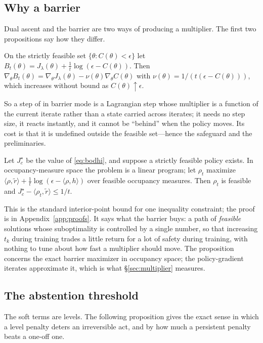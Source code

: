\subsection{Why a barrier}
Dual ascent and the barrier are two ways of producing a multiplier.
The first two propositions say how they differ.

\begin{proposition}
\label{prop:barrier}
On the strictly feasible set $\{\theta: C(\theta)<\epsilon\}$ let $B_t(\theta)=J_\lambda(\theta)+\tfrac1t\log(\epsilon-C(\theta))$.
Then $\nabla_\theta B_t(\theta)=\nabla_\theta J_\lambda(\theta)-\nu(\theta)\nabla_\theta C(\theta)$ with $\nu(\theta)=1/(t(\epsilon-C(\theta)))$, which increases without bound as $C(\theta)\uparrow\epsilon$.
\end{proposition}

So a step of \BRAG{} in barrier mode is a Lagrangian step whose multiplier is a function of the current iterate rather than a state carried across iterates; it needs no step size, it reacts instantly, and it cannot be ``behind'' when the policy moves.
Its cost is that it is undefined outside the feasible set---hence the safeguard and the preliminaries.

\begin{proposition}
\label{prop:gap}
Let $J^\star_c$ be the value of \eqref{eq:bodhi}, and suppose a strictly feasible policy exists.
In occupancy-measure space the problem is a linear program; let $\rho_t$ maximize $\langle\rho,\tilde r\rangle+\tfrac1t\log(\epsilon-\langle\rho,h\rangle)$ over feasible occupancy measures.
Then $\rho_t$ is feasible and $J^\star_c-\langle\rho_t,\tilde r\rangle\le 1/t$.
\end{proposition}

This is the standard interior-point bound \cite[\S11.2]{boyd2004convex} for one inequality constraint; the proof is in Appendix~\ref{app:proofs}.
It says what the barrier buys: a path of \emph{feasible} solutions whose suboptimality is controlled by a single number, so that increasing $t_k$ during training trades a little return for a lot of safety during training, with nothing to tune about how fast a multiplier should move.
The proposition concerns the exact barrier maximizer in occupancy space; the policy-gradient iterates approximate it, which is what \S\ref{sec:multiplier} measures.

\subsection{The abstention threshold}
\label{sec:threshold}
The soft terms are levels.
The following proposition gives the exact sense in which a level penalty deters an irreversible act, and by how much a persistent penalty beats a one-off one.

